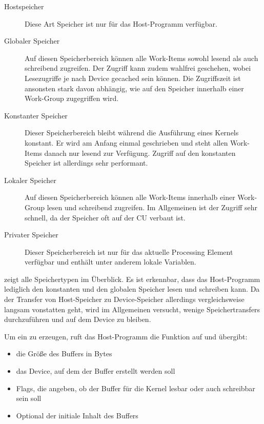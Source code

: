 \begin{description}
\item[Hostspeicher] Diese Art Speicher ist nur für das Host-Programm
verfügbar.
\item[Globaler Speicher] Auf diesen Speicherbereich können alle
Work-Items sowohl lesend als auch schreibend zugreifen. Der Zugriff
kann zudem wahlfrei geschehen, wobei Lesezugriffe je nach Device
gecached sein können. Die Zugriffszeit ist ansonsten stark davon
abhängig, wie auf den Speicher innerhalb einer Work-Group zugegriffen
wird.
\item[Konstanter Speicher] Dieser Speicherbereich bleibt während die
Ausführung eines Kernels konstant. Er wird am Anfang einmal
geschrieben und steht allen Work-Items danach nur lesend zur
Verfügung. Zugriff auf den konstanten Speicher ist allerdings sehr
performant.
\item[Lokaler Speicher] Auf diesen Speicherbereich können alle
Work-Items innerhalb einer Work-Group lesen und schreibend
zugreifen. Im Allgemeinen ist der Zugriff sehr schnell, da der
Speicher oft auf der CU verbaut ist.
\item[Privater Speicher] Dieser Speicherbereich ist nur für das
aktuelle Processing Element verfügbar und enthält unter anderem lokale
Variablen.
\end{description}

 zeigt alle Speichertypen im
Überblick. Es ist erkennbar, dass das Host-Programm lediglich den
konstanten und den globalen Speicher lesen und schreiben kann. Da der
Transfer von Host-Speicher zu Device-Speicher allerdings
vergleichsweise langsam vonstatten geht, wird im Allgemeinen versucht,
wenige Speichertransfers durchzuführen und auf dem Device zu bleiben.

Um ein  zu erzeugen, ruft das Host-Programm die Funktion
 auf und übergibt:

\begin{itemize}
\item die Größe des Buffers in Bytes
\item das Device, auf dem der Buffer erstellt werden
soll
\item Flags, die angeben, ob der Buffer für die Kernel lesbar oder
auch schreibbar sein soll
\item Optional der initiale Inhalt des Buffers
\end{itemize}

